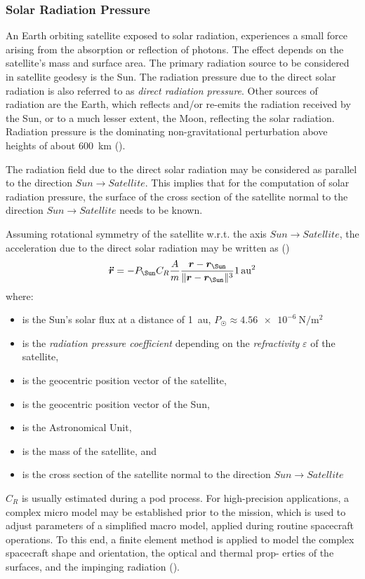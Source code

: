 \subsubsection{Solar Radiation Pressure}\label{sssec:solar-radiation-pressure}

An Earth orbiting satellite exposed to solar radiation, experiences a small force 
arising from the absorption or reflection of photons. The effect depends on the
satellite's mass and surface area. The primary radiation source to be considered 
in satellite geodesy is the Sun. The radiation pressure due to the direct solar 
radiation is also referred to as \emph{direct radiation pressure}. Other sources 
of radiation are the Earth, which reﬂects and/or re-emits the radiation received 
by the Sun, or to a much lesser extent, the Moon, reﬂecting the solar radiation. 
Radiation pressure is the dominating non-gravitational perturbation above heights 
of about \SI{600}{\km} (\cite{BeutlerVII}).

The radiation ﬁeld due to the direct solar radiation may be considered as
parallel to the direction \(Sun \to Satellite\). This implies that for the computation 
of solar radiation pressure, the surface of the cross section of the satellite 
normal to the direction \(Sun \to Satellite\) needs to be known.

Assuming rotational symmetry of the satellite w.r.t. the axis \(Sun \to Satellite\), 
the acceleration due to the direct solar radiation may be written as (\cite{BeutlerVII})
\begin{equation}
    \label{eq:mont375}
    \bm{\ddot{r}} = -P_{\Sun} C_R \frac{A}{m} 
    \frac{\bm{r} - \bm{r}_{\Sun}}{\norm{\bm{r} - \bm{r}_{\Sun}}^3}
    \SI{1}{\astronomicalunit}^2
\end{equation}
where:
\begin{itemize}
\item[$P_{\Sun}$] is the Sun's solar flux at a distance of \SI{1}{\astronomicalunit}, 
  $P_{\Sun} \approx \SI{4.56e-6}{\newton\per\meter\tothe{2}}$
\item[\({C_R}\)] is the \emph{radiation pressure coefficient} depending on the 
  \emph{refractivity} $\varepsilon$ of the satellite, 
\item[\(\bm{r}\)] is the geocentric position vector of the satellite,
\item[\(\bm{r_{\Sun}}\)] is the geocentric position vector of the Sun,
\item[\si{\astronomicalunit}] is the Astronomical Unit,
\item[\(m\)] is the mass of the satellite, and
\item[\(A\)] is the cross section of the satellite normal to the direction 
  \(Sun \to Satellite\)
\end{itemize}
$C_R$ is usually estimated during a \gls{pod} process. For high-precision applications, 
a complex micro model may be established prior to the mission, which is used to
adjust parameters of a simplified macro model, applied during routine spacecraft
operations. To this end, a finite element method is applied to
model the complex spacecraft shape and orientation, the optical and thermal prop-
erties of the surfaces, and the impinging radiation (\cite{Montenbruck2000}).

